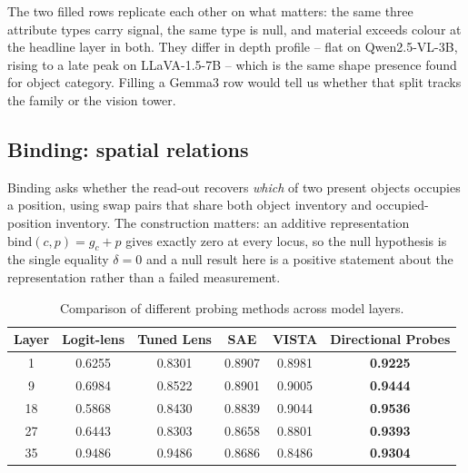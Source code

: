 The two filled rows replicate each other on what matters: the same three
attribute types carry signal, the same type is null, and material exceeds
colour at the headline layer in both. They differ in depth profile -- flat on
Qwen2.5-VL-3B, rising to a late peak on LLaVA-1.5-7B -- which is the same shape
presence found for object category. Filling a Gemma3 row would tell us whether
that split tracks the family or the vision tower.

\subsection{Binding: spatial relations}
\label{sec:exp_binding}

Binding asks whether the read-out recovers \emph{which} of two present objects
occupies a position, using swap pairs that share both object inventory and
occupied-position inventory. The construction matters: an additive
representation $\mathrm{bind}(c,p)=g_c+p$ gives exactly zero at every locus, so
the null hypothesis is the single equality $\delta=0$ and a null result here is
a positive statement about the representation rather than a failed measurement.


\begin{table}[t]
\centering
\caption{Comparison of different probing methods across model layers.}
\label{tab:probe_comparison}
\begin{tabular}{c c c c c c}
\toprule
\textbf{Layer} &
\textbf{Logit-lens} &
\textbf{Tuned Lens} &
\textbf{SAE} &
\textbf{VISTA} &
\textbf{Directional Probes} \\
\midrule
1  & 0.6255 & 0.8301 & 0.8907 & 0.8981 & \textbf{0.9225} \\
9  & 0.6984 & 0.8522 & 0.8901 & 0.9005 & \textbf{0.9444} \\
18 & 0.5868 & 0.8430 & 0.8839 & 0.9044 & \textbf{0.9536} \\
27 & 0.6443 & 0.8303 & 0.8658 & 0.8801 & \textbf{0.9393} \\
35 & 0.9486 & 0.9486 & 0.8686 & 0.8486 & \textbf{0.9304} \\
\bottomrule
\end{tabular}
\end{table}

